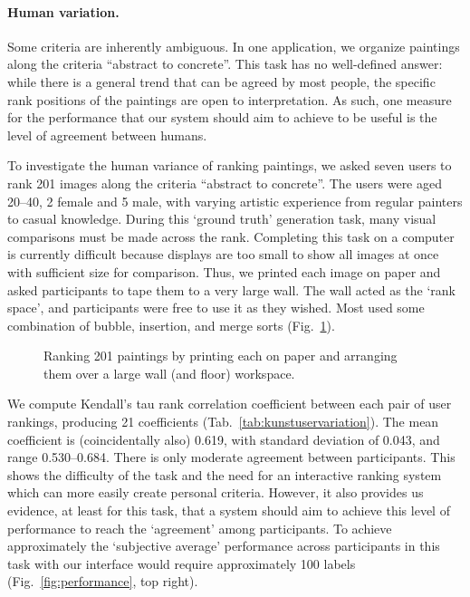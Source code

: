 \documentclass{article}
\begin{document}
\paragraph{Human variation.}
Some criteria are inherently ambiguous. In one application, we organize paintings along the criteria ``abstract to concrete''. This task has no well-defined answer: while there is a general trend that can be agreed by most people, the specific rank positions of the paintings are open to interpretation. As such, one measure for the performance that our system should aim to achieve to be useful is the level of agreement between humans.

To investigate the human variance of ranking paintings, we asked seven users to rank 201 images along the criteria ``abstract to concrete''. The users were aged 20--40, 2 female and 5 male, with varying artistic experience from regular painters to casual knowledge. During this `ground truth' generation task, many visual comparisons must be made across the rank. Completing this task on a computer is currently difficult because displays are too small to show all images at once with sufficient size for comparison. Thus, we printed each image on paper and asked participants to tape them to a very large wall. The wall acted as the `rank space', and participants were free to use it as they wished. Most used some combination of bubble, insertion, and merge sorts (Fig.~\ref{fig:paintingwallranking}).

\begin{figure}[t]
    \centering
    {\caption{Ranking 201 paintings by printing each on paper and arranging them over a large wall (and floor) workspace.}\label{fig:paintingwallranking}}
\end{figure}

We compute Kendall's tau rank correlation coefficient between each pair of user rankings, producing 21 coefficients (Tab.~\ref{tab:kunstuservariation}). The mean coefficient is (coincidentally also) 0.619, with standard deviation of 0.043, and range 0.530--0.684. There is only moderate agreement between participants. This shows the difficulty of the task and the need for an interactive ranking system which can more easily create personal criteria. However, it also provides us evidence, at least for this task, that a system should aim to achieve this level of performance to reach the `agreement' among participants. To achieve approximately the `subjective average' performance across participants in this task with our interface would require approximately 100 labels (Fig.~\ref{fig:performance}, top right). 
\end{document}
